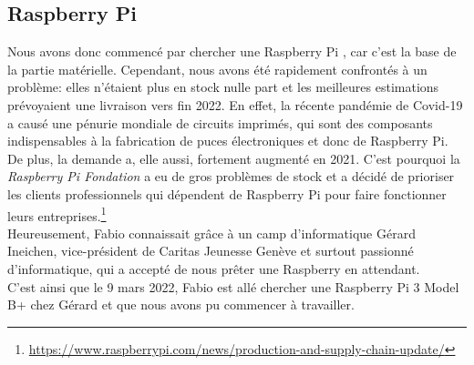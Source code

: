 \documentclass[a4paper]{article}
\begin{document}
\subsection{Raspberry Pi}
Nous avons donc commencé par chercher une Raspberry Pi \cite{raspberry}, car c'est la base de la partie matérielle. Cependant, nous avons été rapidement confrontés à un problème: elles n'étaient plus en stock nulle part et les meilleures estimations prévoyaient une livraison vers fin 2022. En effet, la récente pandémie de Covid-19 a causé une pénurie mondiale de circuits imprimés, qui sont des composants indispensables à la fabrication de puces électroniques et donc de Raspberry Pi. De plus, la demande a, elle aussi, fortement augmenté en 2021. C'est pourquoi la \textit{Raspberry Pi Fondation} a eu de gros problèmes de stock et a décidé de prioriser les clients professionnels qui dépendent de Raspberry Pi pour faire fonctionner leurs entreprises.\footnote{\url{https://www.raspberrypi.com/news/production-and-supply-chain-update/}} \\
Heureusement, Fabio connaissait grâce à un camp d'informatique Gérard Ineichen, vice-président de Caritas Jeunesse Genève et surtout passionné d'informatique, qui a accepté de nous prêter une Raspberry en attendant. \\
C'est ainsi que le 9 mars 2022, Fabio est allé chercher une Raspberry Pi 3 Model B+ chez Gérard et que nous avons pu commencer à travailler.
\end{document}
